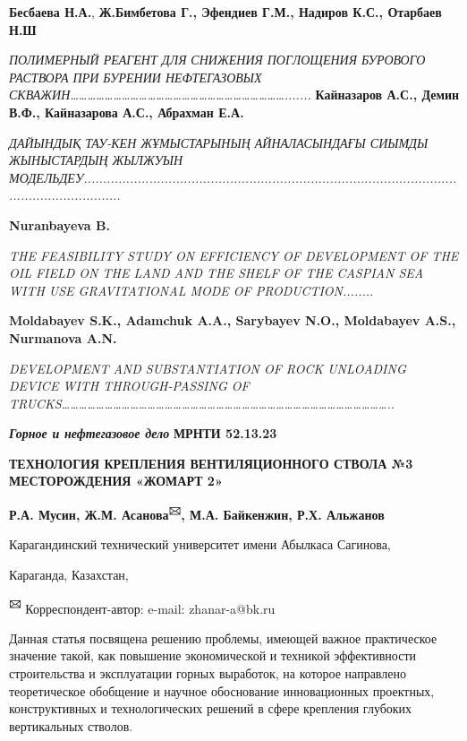 {\bfseries Бесбаева Н.А.}, {\bfseries Ж.Бимбетова Г., Эфендиев Г.М., Надиров
К.С., Отарбаев Н.Ш}

\emph{ПОЛИМЕРНЫЙ РЕАГЕНТ ДЛЯ СНИЖЕНИЯ ПОГЛОЩЕНИЯ БУРОВОГО РАСТВОРА ПРИ
БУРЕНИИ НЕФТЕГАЗОВЫХ
СКВАЖИН\ldots\ldots\ldots\ldots\ldots\ldots\ldots\ldots\ldots\ldots\ldots\ldots\ldots\ldots\ldots\ldots\ldots\ldots\ldots\ldots\ldots\ldots\ldots\ldots\ldots.......}
{\bfseries Кайназаров А.С., Демин В.Ф., Кайназарова А.С., Абрахман Е.А.}

\emph{ДАЙЫНДЫҚ ТАУ-КЕН ЖҰМЫСТАРЫНЫҢ АЙНАЛАСЫНДАҒЫ СИЫМДЫ ЖЫНЫСТАРДЫҢ
ЖЫЛЖУЫН
МОДЕЛЬДЕУ..............................................................................................................................}

{\bfseries Nuranbayeva B.}

\emph{THE FEASIBILITY STUDY ON EFFICIENCY OF DEVELOPMENT OF THE OIL
FIELD ON THE LAND AND THE SHELF OF THE CASPIAN SEA WITH USE
GRAVITATIONAL MODE OF PRODUCTION........}

{\bfseries Moldabayev S.K., Adamchuk A.A., Sarybayev N.O., Moldabayev A.S.,
Nurmanova A.N.}

\emph{DEVELOPMENT AND SUBSTANTIATION OF ROCK UNLOADING DEVICE WITH
THROUGH-PASSING OF
TRUCKS\ldots\ldots\ldots\ldots\ldots\ldots\ldots\ldots\ldots\ldots\ldots\ldots\ldots\ldots\ldots\ldots\ldots\ldots\ldots\ldots\ldots\ldots\ldots\ldots\ldots\ldots\ldots\ldots\ldots\ldots\ldots\ldots\ldots\ldots\ldots\ldots\ldots\ldots..}

\emph{{\bfseries Горное и нефтегазовое дело}}\newpage
{\bfseries МРНТИ 52.13.23}

{\bfseries ТЕХНОЛОГИЯ КРЕПЛЕНИЯ ВЕНТИЛЯЦИОННОГО СТВОЛА №3 МЕСТОРОЖДЕНИЯ
«ЖОМАРТ 2»}

{\bfseries Р.А. Мусин, Ж.М. Асанова\textsuperscript{🖂}, М.А. Байкенжин,
Р.Х. Альжанов}

Карагандинский технический университет имени Абылкаса Сагинова,

Караганда, Казахстан,

{\bfseries \textsuperscript{🖂}} Корреспондент-автор: e-mail: zhanar-a@bk.ru

Данная статья посвящена решению проблемы, имеющей важное практическое
значение такой, как повышение экономической и техникой эффективности
строительства и эксплуатации горных выработок, на которое направлено
теоретическое обобщение и научное обоснование инновационных проектных,
конструктивных и технологических решений в сфере крепления глубоких
вертикальных стволов.

